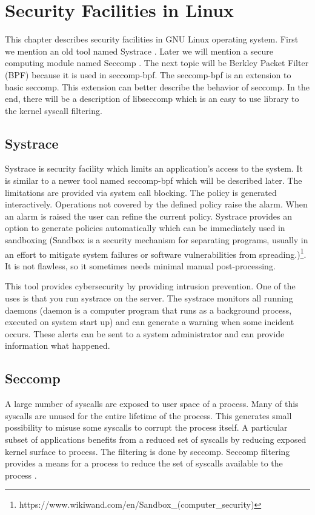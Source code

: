 \chapter{Security Facilities in Linux}
This chapter describes security facilities in GNU Linux operating system.
First we mention an old tool named Systrace \cite{systrace_web}.
Later we will mention a secure computing module named Seccomp \cite{seccomp_sandbox}.
The next topic will be Berkley Packet Filter (BPF) because it is used in seccomp-bpf.
The seccomp-bpf is an extension to basic seccomp.
This extension can better describe the behavior of seccomp.
In the end, there will be a description of libseccomp which is an easy to use library to the kernel syscall filtering.

\section{Systrace}
Systrace is security facility which limits an application's access to the system.
It is similar to a newer tool named seccomp-bpf which will be described later.
The limitations are provided via system call blocking.
The policy is generated interactively.
Operations not covered by the defined policy raise the alarm.
When an alarm is raised the user can refine the current policy.
Systrace provides an option to generate policies automatically which can be immediately used in sandboxing
(Sandbox is a security mechanism for separating programs, usually in an effort to mitigate system failures or software vulnerabilities from spreading.)\footnote{https://www.wikiwand.com/en/Sandbox\_(computer\_security)}.
It is not flawless, so it sometimes needs minimal manual post-processing.

This tool provides cybersecurity by providing intrusion prevention.
One of the uses is that you run systrace on the server.
The systrace monitors all running daemons (daemon is a computer program that runs as a background process, executed on system start up) and can generate a warning when some incident occurs.
These alerts can be sent to a system administrator and can provide information what happened.

\section{Seccomp}
A large number of syscalls are exposed to user space of a process.
Many of this syscalls are unused for the entire lifetime of the process.
This generates small possibility to misuse some syscalls to corrupt the process itself.
A particular subset of applications benefits from a reduced set of syscalls by reducing exposed kernel surface to process.
The filtering is done by seccomp.
Seccomp filtering provides a means for a process to reduce the set of syscalls available to the process \cite{seccomp_kernel_doc}.

